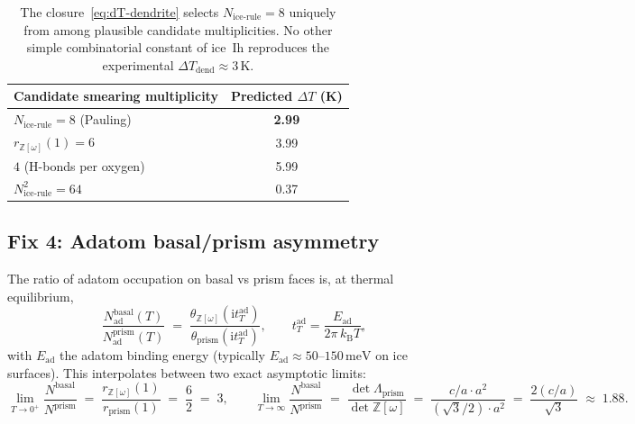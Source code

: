 \documentclass[11pt,letterpaper]{article}
\theoremstyle{plain}
\theoremstyle{definition}
\newcommand{\Eisenstein}{\mathbb{Z}[\omega]}
\newcommand{\kB}{k_{\mathrm{B}}}
\begin{document}
\begin{table}[ht]
\centering
\begin{tabular}{lc}
\toprule
Candidate smearing multiplicity & Predicted $\Delta T$ (K) \\
\midrule
$N_{\text{ice-rule}} = 8$ (Pauling) & \textbf{2.99} \\
$r_{\Eisenstein}(1) = 6$ & 3.99 \\
$4$ (H-bonds per oxygen) & 5.99 \\
$N_{\text{ice-rule}}^2 = 64$ & 0.37 \\
\bottomrule
\end{tabular}
\caption{The closure~\eqref{eq:dT-dendrite} selects
$N_{\text{ice-rule}}=8$ uniquely from among plausible candidate
multiplicities.  No other simple combinatorial constant of ice~Ih
reproduces the experimental $\Delta T_{\text{dend}}\approx 3$\,K.}
\label{tab:dendrite-check}
\end{table}

\subsection{Fix 4: Adatom basal/prism asymmetry}
\label{sec:fix4}

The ratio of adatom occupation on basal vs prism faces is, at
thermal equilibrium,
\begin{equation}\label{eq:adatom-ratio}
  \frac{N_{\text{ad}}^{\text{basal}}(T)}{N_{\text{ad}}^{\text{prism}}(T)}
  \;=\; \frac{\theta_{\Eisenstein}(\mathrm{i} t_T^{\text{ad}})}
             {\theta_{\text{prism}}(\mathrm{i} t_T^{\text{ad}})},
  \qquad
  t_T^{\text{ad}} = \frac{E_{\text{ad}}}{2\pi\,\kB T},
\end{equation}
with $E_{\text{ad}}$ the adatom binding energy (typically
$E_{\text{ad}}\approx 50\text{--}150\,\mathrm{meV}$ on ice surfaces).
This interpolates between two exact asymptotic limits:
\begin{equation}\label{eq:adatom-limits}
  \lim_{T\to 0^+}\frac{N^{\text{basal}}}{N^{\text{prism}}}
    \;=\; \frac{r_{\Eisenstein}(1)}{r_{\text{prism}}(1)}
    \;=\; \frac{6}{2} \;=\; 3,
  \qquad
  \lim_{T\to\infty}\frac{N^{\text{basal}}}{N^{\text{prism}}}
    \;=\; \frac{\det\Lambda_{\text{prism}}}{\det\Eisenstein}
    \;=\; \frac{c/a\cdot a^2}{(\sqrt{3}/2)\cdot a^2}
    \;=\; \frac{2(c/a)}{\sqrt{3}}
    \;\approx\; 1.88.
\end{equation}
\end{document}
